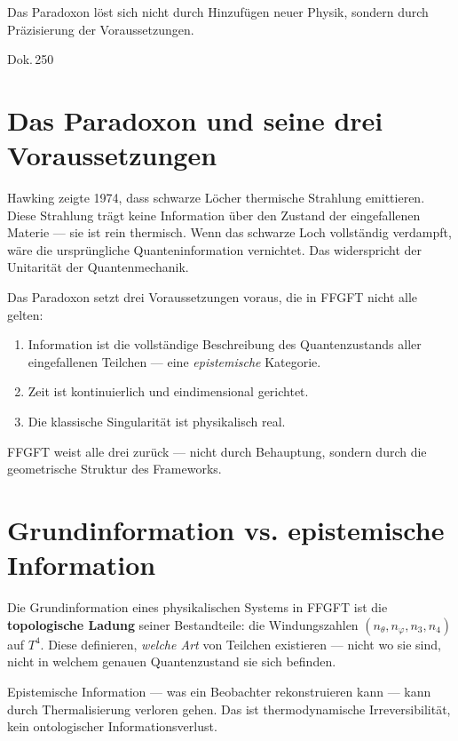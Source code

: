 \label{ch:hawking_info}

\epigraph{Das Paradoxon löst sich nicht durch Hinzufügen neuer Physik,
sondern durch Präzisierung der Voraussetzungen.}{Dok.\,250}

\section{Das Paradoxon und seine drei Voraussetzungen}

Hawking zeigte 1974, dass schwarze Löcher thermische Strahlung emittieren.
Diese Strahlung trägt keine Information über den Zustand der eingefallenen
Materie --- sie ist rein thermisch. Wenn das schwarze Loch vollständig
verdampft, wäre die ursprüngliche Quanteninformation vernichtet. Das
widerspricht der Unitarität der Quantenmechanik.

Das Paradoxon setzt drei Voraussetzungen voraus, die in FFGFT nicht
alle gelten:

\begin{enumerate}
  \item Information ist die vollständige Beschreibung des Quantenzustands
    aller eingefallenen Teilchen --- eine \emph{epistemische} Kategorie.
  \item Zeit ist kontinuierlich und eindimensional gerichtet.
  \item Die klassische Singularität ist physikalisch real.
\end{enumerate}

FFGFT weist alle drei zurück --- nicht durch Behauptung, sondern
durch die geometrische Struktur des Frameworks.

\section{Grundinformation vs. epistemische Information}

\begin{keyresult}
Die Grundinformation eines physikalischen Systems in FFGFT ist die
\textbf{topologische Ladung} seiner Bestandteile: die Windungszahlen
$(n_\theta, n_\varphi, n_3, n_4)$ auf $T^4$. Diese definieren, \emph{welche
Art} von Teilchen existieren --- nicht wo sie sind, nicht in welchem genauen
Quantenzustand sie sich befinden.
\end{keyresult}

Epistemische Information --- was ein Beobachter rekonstruieren kann ---
kann durch Thermalisierung verloren gehen. Das ist thermodynamische
Irreversibilität, kein ontologischer Informationsverlust.

